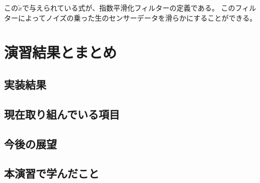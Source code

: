 \documentclass[a4j]{jsarticle}
\begin{document}
この$\tilde{x}$で与えられている式が、指数平滑化フィルターの定義である。
このフィルターによってノイズの乗った生のセンサーデータを滑らかにすることができる。

\section{演習結果とまとめ}

\subsection{実装結果}

\subsection{現在取り組んでいる項目}

\subsection{今後の展望}

\subsection{本演習で学んだこと}
\end{document}
